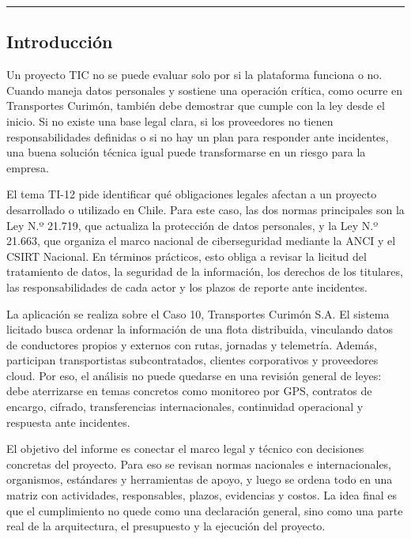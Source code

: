 \begin{center}\rule{0.5\linewidth}{0.5pt}\end{center}

\subsection{Introducción}\label{introducciuxf3n}

Un proyecto TIC no se puede evaluar solo por si la plataforma funciona o no. Cuando maneja datos personales y sostiene una operación crítica, como ocurre en Transportes Curimón, también debe demostrar que cumple con la ley desde el inicio. Si no existe una base legal clara, si los proveedores no tienen responsabilidades definidas o si no hay un plan para responder ante incidentes, una buena solución técnica igual puede transformarse en un riesgo para la empresa.

El tema TI-12 pide identificar qué obligaciones legales afectan a un proyecto desarrollado o utilizado en Chile. Para este caso, las dos normas principales son la Ley N.º 21.719, que actualiza la protección de datos personales, y la Ley N.º 21.663, que organiza el marco nacional de ciberseguridad mediante la ANCI y el CSIRT Nacional. En términos prácticos, esto obliga a revisar la licitud del tratamiento de datos, la seguridad de la información, los derechos de los titulares, las responsabilidades de cada actor y los plazos de reporte ante incidentes.

La aplicación se realiza sobre el Caso 10, Transportes Curimón S.A. El sistema licitado busca ordenar la información de una flota distribuida, vinculando datos de conductores propios y externos con rutas, jornadas y telemetría. Además, participan transportistas subcontratados, clientes corporativos y proveedores cloud. Por eso, el análisis no puede quedarse en una revisión general de leyes: debe aterrizarse en temas concretos como monitoreo por GPS, contratos de encargo, cifrado, transferencias internacionales, continuidad operacional y respuesta ante incidentes.

El objetivo del informe es conectar el marco legal y técnico con decisiones concretas del proyecto. Para eso se revisan normas nacionales e internacionales, organismos, estándares y herramientas de apoyo, y luego se ordena todo en una matriz con actividades, responsables, plazos, evidencias y costos. La idea final es que el cumplimiento no quede como una declaración general, sino como una parte real de la arquitectura, el presupuesto y la ejecución del proyecto.

